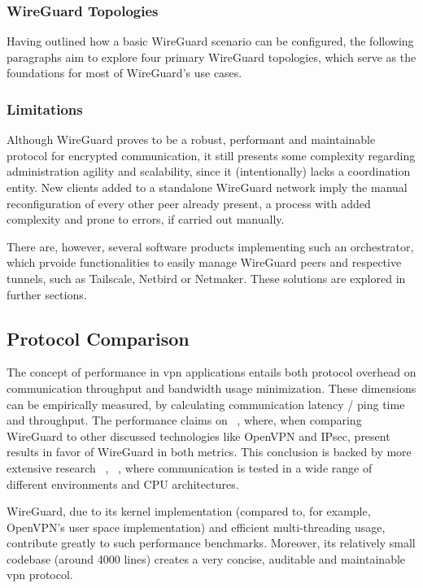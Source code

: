 \documentclass[11pt,twoside,a4paper]{report}
\begin{document}
\subsubsection{WireGuard Topologies}

Having outlined how a basic WireGuard scenario can be configured, the following paragraphs aim to explore four primary WireGuard topologies, which serve as the foundations for most of WireGuard's use cases.


\subsubsection{Limitations}

Although WireGuard proves to be a robust, performant and maintainable protocol for encrypted communication, it still presents some complexity regarding administration agility and scalability, since it (intentionally) lacks a coordination entity. New clients added to a standalone WireGuard network imply the manual reconfiguration of every other peer already present, a process with added complexity and prone to errors, if carried out manually.

There are, however, several software products implementing such an orchestrator, which prvoide functionalities to easily manage WireGuard peers and respective tunnels, such as Tailscale, Netbird or Netmaker. These solutions are explored in further sections.


\subsection{Protocol Comparison}

The concept of performance in \ac{vpn} applications entails both protocol overhead on communication throughput and bandwidth usage minimization. These dimensions can be empirically measured, by calculating communication latency / ping time and throughput. The performance claims on ~\cite{donenfeld2017wireguard}, where, when comparing WireGuard to other discussed technologies like OpenVPN and IPsec, present results in favor of WireGuard in both metrics. This conclusion is backed by more extensive research ~\cite{mackey2020performance}, ~\cite{osswald2020performance}, where communication is tested in a wide range of different environments and CPU architectures.

WireGuard, due to its kernel implementation (compared to, for example, OpenVPN's user space implementation) and efficient multi-threading usage, contribute greatly to such performance benchmarks. Moreover, its relatively small codebase (around 4000 lines) creates a very concise, auditable and maintainable \ac{vpn} protocol.
\end{document}
